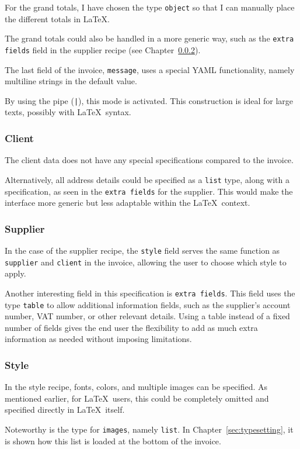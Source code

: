 For the grand totals, I have chosen the type \texttt{object} so that I can manually place the different totals in \LaTeX.

The grand totals could also be handled in a more generic way, such as the \texttt{extra fields} field in the supplier recipe (see Chapter~\ref{sec:supplier spec}).

The last field of the invoice, \texttt{message}, uses a special YAML functionality, namely multiline strings in the default value.

By using the pipe (\texttt{|}), this mode is activated.
This construction is ideal for large texts, possibly with \LaTeX\ syntax.

\subsubsection{Client}
The client data does not have any special specifications compared to the invoice.

Alternatively, all address details could be specified as a \texttt{list} type, along with a specification, as seen in the \texttt{extra fields} for the supplier.
This would make the interface more generic but less adaptable within the \LaTeX\ context.

\subsubsection{Supplier}\label{sec:supplier spec}
In the case of the supplier recipe, the \texttt{style} field serves the same function as \texttt{supplier} and \texttt{client} in the invoice, allowing the user to choose which style to apply.


Another interesting field in this specification is \texttt{extra fields}.
This field uses the type \texttt{table} to allow additional information fields, such as the supplier's account number, VAT number, or other relevant details.
Using a table instead of a fixed number of fields gives the end user the flexibility to add as much extra information as needed without imposing limitations.

\subsubsection{Style}
In the style recipe, fonts, colors, and multiple images can be specified.
As mentioned earlier, for \LaTeX\ users, this could be completely omitted and specified directly in \LaTeX\ itself.

Noteworthy is the type for \texttt{images}, namely \texttt{list}.
In Chapter~\ref{sec:typesetting}, it is shown how this list is loaded at the bottom of the invoice.

